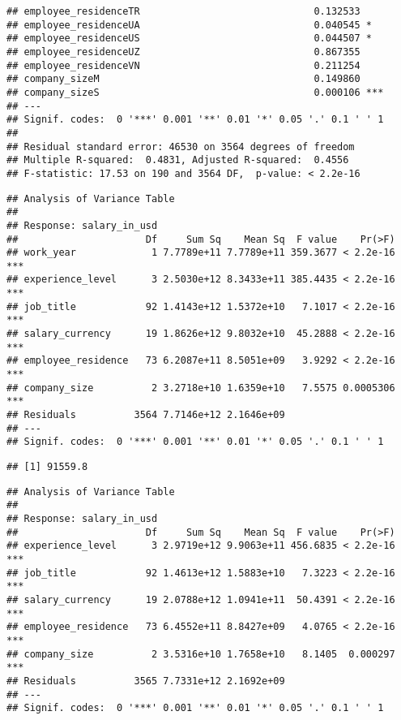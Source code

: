 \documentclass[
]{article}
\begin{document}
\begin{verbatim}
## employee_residenceTR                              0.132533    
## employee_residenceUA                              0.040545 *  
## employee_residenceUS                              0.044507 *  
## employee_residenceUZ                              0.867355    
## employee_residenceVN                              0.211254    
## company_sizeM                                     0.149860    
## company_sizeS                                     0.000106 ***
## ---
## Signif. codes:  0 '***' 0.001 '**' 0.01 '*' 0.05 '.' 0.1 ' ' 1
## 
## Residual standard error: 46530 on 3564 degrees of freedom
## Multiple R-squared:  0.4831, Adjusted R-squared:  0.4556 
## F-statistic: 17.53 on 190 and 3564 DF,  p-value: < 2.2e-16
\end{verbatim}

\begin{verbatim}
## Analysis of Variance Table
## 
## Response: salary_in_usd
##                      Df     Sum Sq    Mean Sq  F value    Pr(>F)    
## work_year             1 7.7789e+11 7.7789e+11 359.3677 < 2.2e-16 ***
## experience_level      3 2.5030e+12 8.3433e+11 385.4435 < 2.2e-16 ***
## job_title            92 1.4143e+12 1.5372e+10   7.1017 < 2.2e-16 ***
## salary_currency      19 1.8626e+12 9.8032e+10  45.2888 < 2.2e-16 ***
## employee_residence   73 6.2087e+11 8.5051e+09   3.9292 < 2.2e-16 ***
## company_size          2 3.2718e+10 1.6359e+10   7.5575 0.0005306 ***
## Residuals          3564 7.7146e+12 2.1646e+09                       
## ---
## Signif. codes:  0 '***' 0.001 '**' 0.01 '*' 0.05 '.' 0.1 ' ' 1
\end{verbatim}

\begin{verbatim}
## [1] 91559.8
\end{verbatim}

\begin{verbatim}
## Analysis of Variance Table
## 
## Response: salary_in_usd
##                      Df     Sum Sq    Mean Sq  F value    Pr(>F)    
## experience_level      3 2.9719e+12 9.9063e+11 456.6835 < 2.2e-16 ***
## job_title            92 1.4613e+12 1.5883e+10   7.3223 < 2.2e-16 ***
## salary_currency      19 2.0788e+12 1.0941e+11  50.4391 < 2.2e-16 ***
## employee_residence   73 6.4552e+11 8.8427e+09   4.0765 < 2.2e-16 ***
## company_size          2 3.5316e+10 1.7658e+10   8.1405  0.000297 ***
## Residuals          3565 7.7331e+12 2.1692e+09                       
## ---
## Signif. codes:  0 '***' 0.001 '**' 0.01 '*' 0.05 '.' 0.1 ' ' 1
\end{verbatim}
\end{document}
